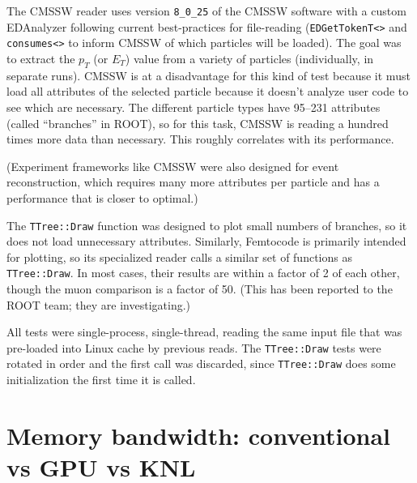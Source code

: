 \documentclass[12pt]{article}
\begin{document}
The CMSSW reader uses version {\tt 8\_0\_25} of the CMSSW software with a custom EDAnalyzer following current best-practices for file-reading ({\tt EDGetTokenT<>} and {\tt consumes<>} to inform CMSSW of which particles will be loaded). The goal was to extract the $p_T$ (or $E_T$) value from a variety of particles (individually, in separate runs). CMSSW is at a disadvantage for this kind of test because it must load all attributes of the selected particle because it doesn't analyze user code to see which are necessary. The different particle types have 95--231 attributes (called ``branches'' in ROOT), so for this task, CMSSW is reading a hundred times more data than necessary. This roughly correlates with its performance.

(Experiment frameworks like CMSSW were also designed for event reconstruction, which requires many more attributes per particle and has a performance that is closer to optimal.)

The {\tt TTree::Draw} function was designed to plot small numbers of branches, so it does not load unnecessary attributes. Similarly, Femtocode is primarily intended for plotting, so its specialized reader calls a similar set of functions as {\tt TTree::Draw}. In most cases, their results are within a factor of 2 of each other, though the muon comparison is a factor of 50. (This has been reported to the ROOT team; they are investigating.)

All tests were single-process, single-thread, reading the same input file that was pre-loaded into Linux cache by previous reads. The {\tt TTree::Draw} tests were rotated in order and the first call was discarded, since {\tt TTree::Draw} does some initialization the first time it is called.

\section*{Memory bandwidth: conventional vs GPU vs KNL}
\end{document}
